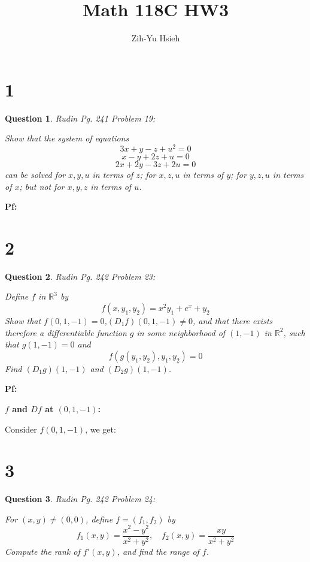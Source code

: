 \documentclass{article}
\title{Math 118C HW3}
\author{Zih-Yu Hsieh}
\newtheorem{question}{Question}
\begin{document}
\maketitle

\section*{1}
\begin{myBox}[]{}
    \begin{question}
        Rudin Pg. 241 Problem 19:

        Show that the system of equations
        $$3x+y-z+u^2=0$$
        $$x-y+2z+u=0$$
        $$2x+2y-3z+2u=0$$
        can be solved for $x,y,u$ in terms of $z$; for $x,z,u$ in terms of $y$; for $y,z,u$ in terms of $x$; but not for $x,y,z$ in terms of $u$.
    \end{question}
\end{myBox}

\textbf{Pf:}

\break

\section*{2}
\begin{myBox}[]{}
    \begin{question}
        Rudin Pg. 242 Problem 23:

        Define $f$ in $\mathbb{R}^3$ by
        $$f(x,y_1,y_2)=x^2y_1+e^x+y_2$$
        Show that $f(0,1,-1)=0$,$(D_1f)(0,1,-1)\neq 0$, and that there exists therefore a differentiable function $g$ in some neighborhood of $(1,-1)$ in $\mathbb{R}^2$,
        such that $g(1,-1)=0$ and 
        $$f(g(y_1,y_2),y_1,y_2)=0$$
        Find $(D_1g)(1,-1)$ and $(D_2g)(1,-1)$.
    \end{question}
\end{myBox}

\textbf{Pf:}

\textbf{$f$ and $Df$ at $(0,1,-1)$:}

Consider $f(0,1,-1)$, we get:
$$$$

\break

\section*{3}
\begin{myBox}[]{}
    \begin{question}
        Rudin Pg. 242 Problem 24:

        For $(x,y)\neq (0,0)$, define $f=(f_1,f_2)$ by 
        $$f_1(x,y)=\frac{x^2-y^2}{x^2+y^2},\quad f_2(x,y)=\frac{xy}{x^2+y^2}$$
        Compute the rank of $f'(x,y)$, and find the range of $f$.
    \end{question}
\end{myBox}
\end{document}
